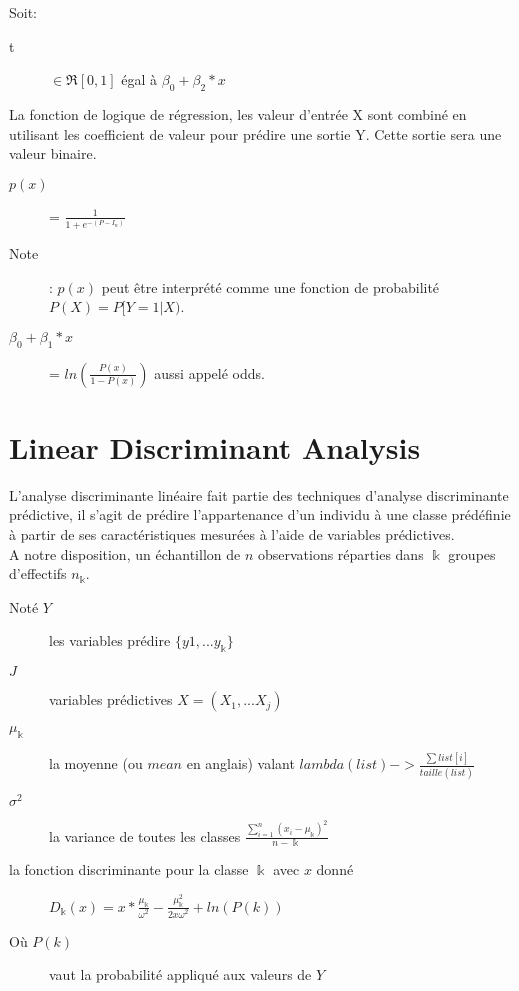 Soit:
\begin{description}
\item[t] $\in \Re[0,1]$ égal à $\beta_0 + \beta_2 * x$
\end{description}

La fonction de logique de régression, les valeur d'entrée X sont combiné en utilisant les coefficient de valeur pour prédire une sortie Y. Cette sortie sera une valeur binaire.

\begin{description}
\item[$p(x)$] = $ \frac{1}{1 + e^{-(P-I_n)}}$
\item[Note]: $p(x)$ peut être interprété comme une fonction de probabilité $P(X) = P[Y=1 | X)$.
\item[$\beta_0 + \beta_1 * x$] = $ ln(\frac{P(x)}{1 - P(x)})$ aussi appelé odds.
\end{description}

\chapter{Linear Discriminant Analysis}
L'analyse discriminante linéaire fait partie des techniques d'analyse discriminante prédictive, il s'agit de prédire l'appartenance d'un individu à une classe prédéfinie à partir de ses caractéristiques mesurées à l'aide de variables prédictives.\\
A notre disposition, un échantillon de $n$ observations réparties dans $\Bbbk$ groupes d'effectifs $n_{\Bbbk}$.\\
\begin{description}
\item[Noté $Y$] les variables prédire $\{y1, ... y_{\Bbbk}\}$
\item[$J$] variables prédictives $X = (X_1, ... X_j)$
\item[$\mu_{\Bbbk}$] la moyenne (ou $\textit{mean}$ en anglais) valant $lambda(list) -> \frac{\sum list[i]}{taille(list)}$
\item[$\sigma^2$] la variance de toutes les classes $\frac{\sum_{i=1}^n (x_i - \mu_{\Bbbk})^2}{n - \Bbbk}$
\item[la fonction discriminante pour la classe $\Bbbk$ avec $x$ donné] $D_{\Bbbk} (x) = x * \frac{\mu_{\Bbbk}}{\omega^2} - \frac{\mu_{\Bbbk}^2}{2x\omega^2} + ln(P(k))$
\item[Où $P(k)$] vaut la probabilité appliqué aux valeurs de $Y$
\end{description}

